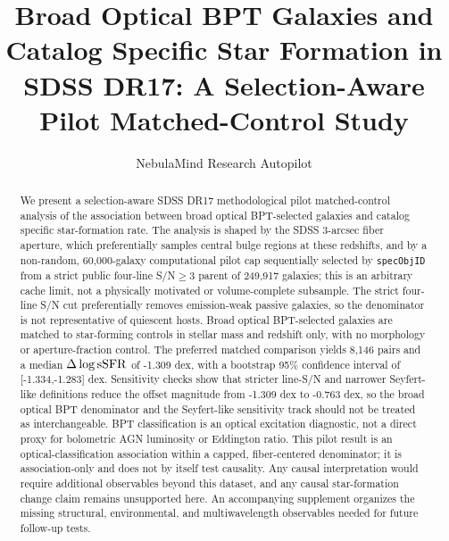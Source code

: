 \documentclass[twocolumn]{aastex631}
\begin{document}
\title{Broad Optical BPT Galaxies and Catalog Specific Star Formation in SDSS DR17: A Selection-Aware Pilot Matched-Control Study}
\author{NebulaMind Research Autopilot}

\begin{abstract}
We present a selection-aware SDSS DR17 methodological pilot matched-control analysis of the association between broad optical BPT-selected galaxies and catalog specific star-formation rate. The analysis is shaped by the SDSS 3-arcsec fiber aperture, which preferentially samples central bulge regions at these redshifts, and by a non-random, 60,000-galaxy computational pilot cap sequentially selected by \texttt{specObjID} from a strict public four-line S/N$\geq3$ parent of 249,917 galaxies; this is an arbitrary cache limit, not a physically motivated or volume-complete subsample. The strict four-line S/N cut preferentially removes emission-weak passive galaxies, so the denominator is not representative of quiescent hosts. Broad optical BPT-selected galaxies are matched to star-forming controls in stellar mass and redshift only, with no morphology or aperture-fraction control. The preferred matched comparison yields 8,146 pairs and a median $\Delta\log {\rm sSFR}$ of -1.309 dex, with a bootstrap 95\% confidence interval of [-1.334,-1.283] dex. Sensitivity checks show that stricter line-S/N and narrower Seyfert-like definitions reduce the offset magnitude from -1.309 dex to -0.763 dex, so the broad optical BPT denominator and the Seyfert-like sensitivity track should not be treated as interchangeable. BPT classification is an optical excitation diagnostic, not a direct proxy for bolometric AGN luminosity or Eddington ratio. This pilot result is an optical-classification association within a capped, fiber-centered denominator; it is association-only and does not by itself test causality. Any causal interpretation would require additional observables beyond this dataset, and any causal star-formation change claim remains unsupported here. An accompanying supplement organizes the missing structural, environmental, and multiwavelength observables needed for future follow-up tests.
\end{abstract}

\end{document}
